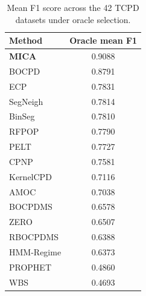 \begin{table}[H]
\centering
\caption{Mean F1 score across the 42 TCPD datasets under oracle selection.}
\label{tab:tcpd-mean-f1}
\begin{tabular}{lc}
\toprule
Method & Oracle mean F1 \\
\midrule
\textbf{MICA} & 0.9088 \\
BOCPD & 0.8791 \\
ECP & 0.7831 \\
SegNeigh & 0.7814 \\
BinSeg & 0.7810 \\
RFPOP & 0.7790 \\
PELT & 0.7727 \\
CPNP & 0.7581 \\
KernelCPD & 0.7116 \\
AMOC & 0.7038 \\
BOCPDMS & 0.6578 \\
ZERO & 0.6507 \\
RBOCPDMS & 0.6388 \\
HMM-Regime & 0.6373 \\
PROPHET & 0.4860 \\
WBS & 0.4693 \\
\bottomrule
\end{tabular}
\end{table}
